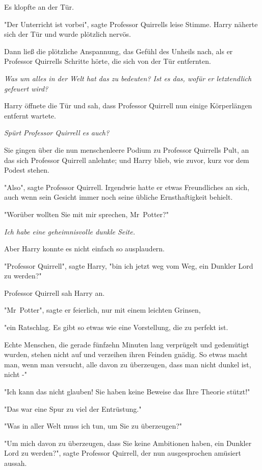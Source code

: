 {Es klopfte an der Tür.

"Der Unterricht ist vorbei", sagte Professor Quirrells leise Stimme. Harry näherte sich der Tür und wurde plötzlich nervös.

Dann ließ die plötzliche Anspannung, das Gefühl des Unheils nach, als er Professor Quirrells Schritte hörte, die sich von der Tür entfernten.

\emph{Was um alles in der Welt hat das zu bedeuten? Ist es das, wofür er letztendlich gefeuert wird?}

Harry öffnete die Tür und sah, dass Professor Quirrell nun einige Körperlängen entfernt wartete.

\emph{Spürt Professor Quirrell es auch?}

Sie gingen über die nun menschenleere Podium zu Professor Quirrells Pult, an das sich Professor Quirrell anlehnte; und Harry blieb, wie zuvor, kurz vor dem Podest stehen.

"Also", sagte Professor Quirrell. Irgendwie hatte er etwas Freundliches an sich, auch wenn sein Gesicht immer noch seine übliche Ernsthaftigkeit behielt.

"Worüber wollten Sie mit mir sprechen, Mr~Potter?"

\emph{Ich habe eine geheimnisvolle dunkle Seite.}

Aber Harry konnte es nicht einfach so ausplaudern.

"Professor Quirrell", sagte Harry, "bin ich jetzt weg vom Weg, ein Dunkler Lord zu werden?"

Professor Quirrell sah Harry an.

"Mr~Potter", sagte er feierlich, nur mit einem leichten Grinsen,

"ein Ratschlag. Es gibt so etwas wie eine Vorstellung, die zu perfekt ist.

Echte Menschen, die gerade fünfzehn Minuten lang verprügelt und gedemütigt wurden, stehen nicht auf und verzeihen ihren Feinden gnädig. So etwas macht man, wenn man versucht, alle davon zu überzeugen, dass man nicht dunkel ist, nicht -"

"Ich kann das nicht glauben! Sie haben keine Beweise das Ihre Theorie stützt!"

"Das war eine Spur zu viel der Entrüstung."

"Was in aller Welt muss ich tun, um Sie zu überzeugen?"

"Um mich davon zu überzeugen, dass Sie keine Ambitionen haben, ein Dunkler Lord zu werden?", sagte Professor Quirrell, der nun ausgesprochen amüsiert aussah.

}
